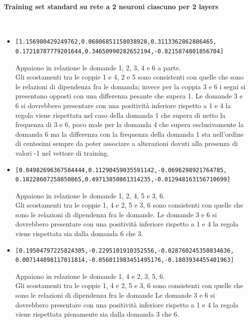 \paragraph{Training set standard su rete a 2 neuroni ciascuno per 2 layers}\mbox{}
\label{Training set standard su rete a 2 neuroni}
\\
\noindent
\begin{itemize}
\item \begin{verbatim}[1.156980429249762,0.06806851158038928,0.3113362862886465,
0.17218787779201644,0.34650990282652194,-0.8215874801856704]\end{verbatim}
Appaiono in relazione le domande 1, 2, 3, 4  e 6 a parte.\\
Gli scostamenti tra le coppie  1 e 4, 2 e 5 sono consistenti con quelle che sono le relazioni di dipendenza fra le domanda; invece per la coppia 3 e 6 i segni si presentano opposti  con una differenza pesante che supera 1.
Le domande 3 e 6 si dovrebbero presentare con una positivit\`a inferiore rispetto a 1 e 4 la regola viene rispettata nel caso della domanda 1 che supera di netto la frequenza di 3 e 6, poco male per la domanda 4 che supera esclusivamente la domanda 6 ma la differenza con la frequenza della domanda 1 sta nell'ordine di centesimi sempre da poter associare a alterazioni dovuti alla presenza di valori -1 nel vettore di training.

\item \begin{verbatim}[0.04982696367584444,0.11290459035591142,-0.0696298921764785, 
0.18228607258850865,0.49713850861314235,-0.012948163156710699]\end{verbatim}
Appaiono in relazione le domande 1, 2, 4, 5 e 3, 6.\\
Gli scostamenti tra le coppie 1, 4 e 2, 5  e 3, 6 sono consistenti con quelle che sono le relazioni di dipendenza fra le domande.
Le domande 3 e 6 si dovrebbero presentare con una positivit\`a inferiore rispetto a 1 e 4 la regola viene rispettata sia dalla domanda 6 che 3.

\item \begin{verbatim}[0.19504797225824305,-0.2295101910352556,-0.028760245350834636,
0.007144898117011814,-0.056011983451495176,-0.1803934455401963]\end{verbatim}
Appaiono in relazione le domande 1, 4 e 2, 3, 5, 6.\\
Gli scostamenti tra le coppie 1, 4 e 2, 5 e 3, 6 sono consistenti con quelle che sono le relazioni di dipendenza fra le domande
Le domande 3 e 6 si dovrebbero presentare con una positivit\`a inferiore rispetto a 1 e 4 la regola viene rispettata pienamente sia dalla domanda 3 che 6.


\end{itemize}
